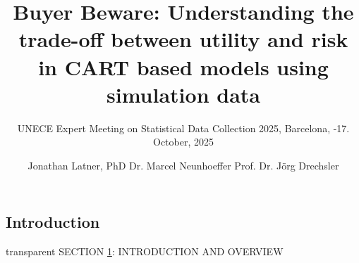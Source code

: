 \documentclass[t,8pt,utfx8]{beamer}
\title{Buyer Beware: Understanding the trade-off between utility and risk in CART based models using simulation data}
\subtitle{
UNECE Expert Meeting on Statistical Data Collection 2025, \newline Barcelona, \newline 15-17. October, 2025}
\author{Jonathan Latner, PhD \newline Dr. Marcel Neunhoeffer \newline Prof. Dr. Jörg Drechsler}
\begin{document}
\frame[plain]{\titlepage}

\begin{spacing}{1.25}

\section{Introduction}\label{sec:introduction}

\begin{frame}[c,plain]
\vskip-4mm
\begin{beamercolorbox}[wd=\boxwidth,ht=22.11mm]{transparent}%
    \vfill%
    \leftinsert%
    \MakeUppercase{Section \ref{sec:introduction}: Introduction and overview
} %
\end{beamercolorbox}
\vskip-3mm
\end{frame}


\end{spacing}
\end{document}
